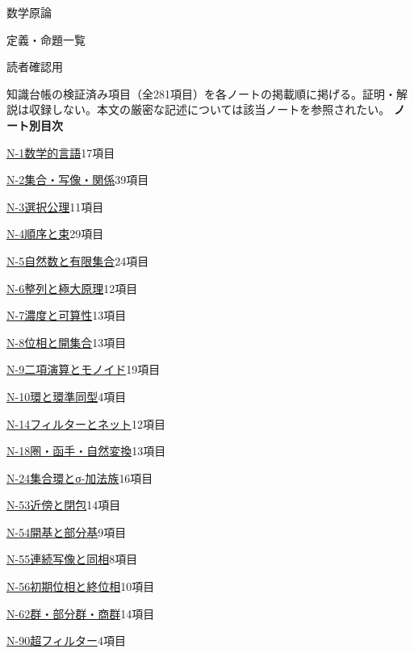\documentclass[a5paper,10pt,dvipdfmx]{jsarticle}
\begin{document}
\begin{center}
{\small 数学原論}\par\vspace{3mm}
{\LARGE 定義・命題一覧}\par\vspace{2mm}
{\small 読者確認用}
\end{center}
知識台帳の検証済み項目（全281項目）を各ノートの掲載順に掲げる。証明・解説は収録しない。本文の厳密な記述については該当ノートを参照されたい。
\bigskip
\textbf{ノート別目次}\par\smallskip
\hyperlink{note-1}{N-1\quad 数学的言語}\dotfill 17項目\par
\hyperlink{note-2}{N-2\quad 集合・写像・関係}\dotfill 39項目\par
\hyperlink{note-3}{N-3\quad 選択公理}\dotfill 11項目\par
\hyperlink{note-4}{N-4\quad 順序と束}\dotfill 29項目\par
\hyperlink{note-5}{N-5\quad 自然数と有限集合}\dotfill 24項目\par
\hyperlink{note-6}{N-6\quad 整列と極大原理}\dotfill 12項目\par
\hyperlink{note-7}{N-7\quad 濃度と可算性}\dotfill 13項目\par
\hyperlink{note-8}{N-8\quad 位相と開集合}\dotfill 13項目\par
\hyperlink{note-9}{N-9\quad 二項演算とモノイド}\dotfill 19項目\par
\hyperlink{note-10}{N-10\quad 環と環準同型}\dotfill 4項目\par
\hyperlink{note-14}{N-14\quad フィルターとネット}\dotfill 12項目\par
\hyperlink{note-18}{N-18\quad 圏・函手・自然変換}\dotfill 13項目\par
\hyperlink{note-24}{N-24\quad 集合環とσ-加法族}\dotfill 16項目\par
\hyperlink{note-53}{N-53\quad 近傍と閉包}\dotfill 14項目\par
\hyperlink{note-54}{N-54\quad 開基と部分基}\dotfill 9項目\par
\hyperlink{note-55}{N-55\quad 連続写像と同相}\dotfill 8項目\par
\hyperlink{note-56}{N-56\quad 初期位相と終位相}\dotfill 10項目\par
\hyperlink{note-62}{N-62\quad 群・部分群・商群}\dotfill 14項目\par
\hyperlink{note-90}{N-90\quad 超フィルター}\dotfill 4項目\par
\par\bigskip
{}
\hypertarget{note-1}{}
\end{document}
